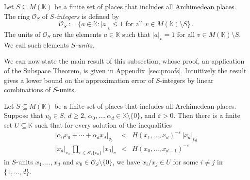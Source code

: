 \documentclass[a4paper,UKenglish,cleveref, autoref, thm-restate]{lipics-v2021}
\begin{document}
Let $S\subseteq M(\mathbb K)$ be a finite set of places that includes all
Archimedean places. 
The ring $\mathcal O_S$ of \emph{$S$-integers}
is defined by
\[ \mathcal O_S :=\{a\in\mathbb K : |a|_v\leq 1 \text{ for all $v\in
M(\mathbb K)\setminus S$} \}  \, .\]
The units of $\mathcal O_S$ are the elements $a \in \mathbb K$ such that $|a|_v=1$ for all $v \in M(\mathbb K)\setminus S$.
We call such elements \emph{$S$-units}.

We can now state the main result of this subsection, whose 
proof, an application of the Subspace Theorem, is given in Appendix~\ref{sec:proofs}.  Intuitively the result gives  a lower bound on 
the approximation error of 
$S$-integers by linear combinations of $S$-units.

\begin{lemma}
Let $S\subseteq M(\mathbb K)$ be a finite set of places that includes all
Archimedean places.
Suppose that $v_0 \in S$, $d\geq 2$,
  $\alpha_0,\ldots,\alpha_d \in \mathbb K \setminus\{0\}$, and $\varepsilon>0$.
  Then there is a finite set $U\subseteq \mathbb K$ such that for every solution of the inequalities
% 
\begin{eqnarray*}| \alpha_0 x_0 + \cdots + \alpha_dx_d|_{v_0} &<& H(x_1,\ldots,x_d)^{-\varepsilon} \, |x_d|_{v_0}  \\
|x_d|_{v_0} \,  \prod_{v \in S \setminus \{v_0\}} |x_0|_v&<& H(x_0,\ldots,x_{d-1})^{-\varepsilon} 
\end{eqnarray*}
in $S$-units $x_1,\ldots,x_d$ and $x_0 \in \mathcal O_S \setminus \{0\}$, 
we have $x_i/x_j \in U$ for some $i\neq j$ in $\{1,\ldots,d\}$.
\label{lem:s-unit-plus}
\end{lemma}
\end{document}
